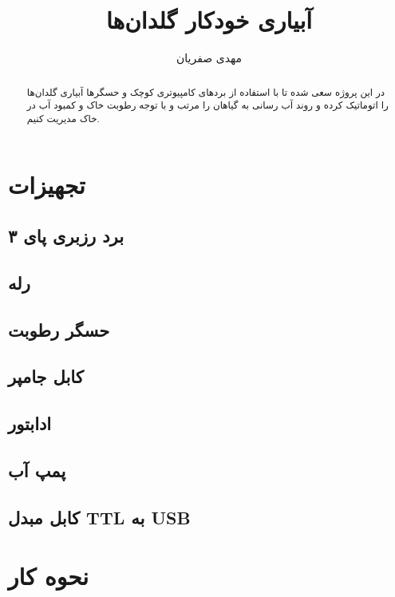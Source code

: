 \documentclass{article}
\begin{document}

\tableofcontents
\begin{titlingpage}
\title{آبیاری خودکار گلدان‌ها}
\author{مهدی صفریان}
\date{}
  \maketitle
  \begin{abstract}
   
    در این پروژه سعی شده تا با استفاده از بردهای کامپیوتری کوچک و حسگرها آبیاری گلدان‌ها را اتوماتیک کرده
    و روند آب‌ رسانی به گیاهان را مرتب و با توجه رطوبت خاک و کمبود آب در خاک مدیریت کنیم.
   
  \end{abstract}
\end{titlingpage}

\section{تجهیزات}
\subsection{برد رزبری پای ۳ }
\subsection{رله}
\subsection{حسگر رطوبت}
\subsection{کابل جامپر}
\subsection{ادابتور}
\subsection{پمپ آب}

\subsection{کابل مبدل TTL به USB}
  \section{نحوه کار}
\end{document}

